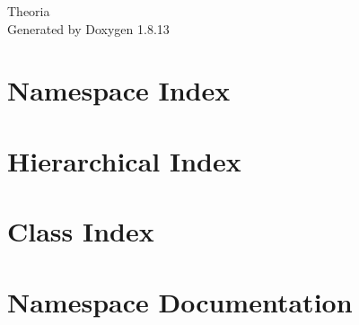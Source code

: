 \documentclass[twoside]{book}
\newcommand{\+}{\discretionary{\mbox{\scriptsize$\hookleftarrow$}}{}{}}
\newcommand{\clearemptydoublepage}{%
  \newpage{\pagestyle{empty}\cleardoublepage}%
}
\begin{document}
\hypersetup{pageanchor=false,
             bookmarksnumbered=true,
             pdfencoding=unicode
            }
\begin{titlepage}
\vspace*{7cm}
\begin{center}%
{\Large Theoria }\\
\vspace*{1cm}
{\large Generated by Doxygen 1.8.13}\\
\end{center}
\end{titlepage}
\clearemptydoublepage
{}
\tableofcontents
\clearemptydoublepage
{}
\hypersetup{pageanchor=true}

\chapter{Namespace Index}

\chapter{Hierarchical Index}

\chapter{Class Index}

\chapter{Namespace Documentation}

\end{document}
